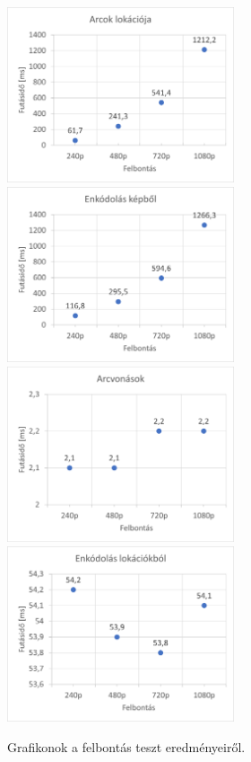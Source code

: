 \begin{figure}[!ht]
	\centering
	\includegraphics[width=67mm, keepaspectratio]{03_images/graph2/mennyiseg1.png}\hspace{1cm}
	\includegraphics[width=67mm, keepaspectratio]{03_images/graph2/mennyiseg12.png}\\\vspace{5mm}
	\includegraphics[width=67mm, keepaspectratio]{03_images/graph2/mennyiseg123.png}\hspace{1cm}
	\includegraphics[width=67mm, keepaspectratio]{03_images/graph2/mennyiseg1234.png}
	\caption{Grafikonok a felbontás teszt eredményeiről.}
	\label{fig:res_graphs}
\end{figure}



